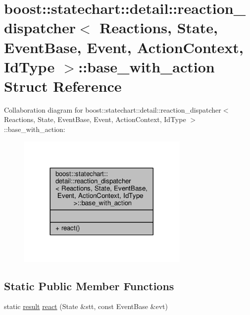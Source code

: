 \hypertarget{structboost_1_1statechart_1_1detail_1_1reaction__dispatcher_1_1base__with__action}{}\section{boost\+:\+:statechart\+:\+:detail\+:\+:reaction\+\_\+dispatcher$<$ Reactions, State, Event\+Base, Event, Action\+Context, Id\+Type $>$\+:\+:base\+\_\+with\+\_\+action Struct Reference}
\label{structboost_1_1statechart_1_1detail_1_1reaction__dispatcher_1_1base__with__action}


Collaboration diagram for boost\+:\+:statechart\+:\+:detail\+:\+:reaction\+\_\+dispatcher$<$ Reactions, State, Event\+Base, Event, Action\+Context, Id\+Type $>$\+:\+:base\+\_\+with\+\_\+action\+:
\nopagebreak
\begin{figure}[H]
\begin{center}
\leavevmode
\includegraphics[width=236pt]{structboost_1_1statechart_1_1detail_1_1reaction__dispatcher_1_1base__with__action__coll__graph}
\end{center}
\end{figure}
\subsection*{Static Public Member Functions}
\begin{DoxyCompactItemize}
\item 
static \mbox{\hyperlink{namespaceboost_1_1statechart_abe807f6598b614d6d87bb951ecd92331}{result}} \mbox{\hyperlink{structboost_1_1statechart_1_1detail_1_1reaction__dispatcher_1_1base__with__action_a325fa0584944412ec6e24377c1b67dfc}{react}} (State \&stt, const Event\+Base \&evt)
\end{DoxyCompactItemize}


